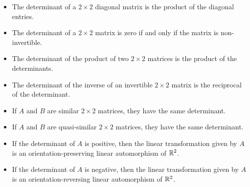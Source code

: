 \documentclass[10pt]{amsart}
\begin{document}
\begin{itemize}
\item The determinant of a $2 \times 2$ diagonal matrix is the product
  of the diagonal entries.
\item The determinant of a $2 \times 2$ matrix is zero if and only
  if the matrix is non-invertible.
\item The determinant of the product of two $2 \times 2$ matrices is
  the product of the determinants.
\item The determinant of the inverse of an invertible $2 \times 2$
  matrix is the reciprocal of the determinant.
\item If $A$ and $B$ are similar $2 \times 2$ matrices, they have
  the same determinant.
\item If $A$ and $B$ are quasi-similar $2 \times 2$ matrices, they
  have the same determinant.
\item If the determinant of $A$ is positive, then the linear
  transformation given by $A$ is an orientation-preserving linear
  automorphism of $\mathbb{R}^2$.
\item If the determinant of $A$ is negative, then the linear
  transformation given by $A$ is an orientation-reversing linear
  automorphism of $\mathbb{R}^2$.
\end{itemize}
\end{document}

